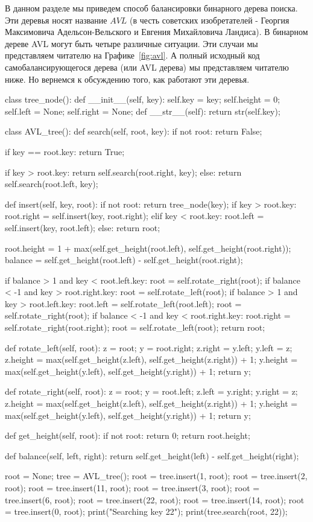 В данном разделе мы приведем способ балансировки бинарного дерева поиска. Эти деревья
носят название $AVL$ (в честь советских изобретателей - Георгия Максимовича 
Адельсон-Вельского и Евгения Михайловича Ландиса). В бинарном дереве AVL могут быть 
четыре различные ситуации. Эти случаи мы представляем читателю на Графике~\ref{fig:avl}.
А полный исходный код самобалансирующегося дерева (или AVL дерева) мы представляем
читателю ниже. Но вернемся к обсуждению того, как работают эти деревья. 

\begin{python}
class tree_node():
	def __init__(self, key):
		self.key = key;
		self.height = 0;
		self.left = None;
		self.right = None;
	def __str__(self):
		return str(self.key);

class AVL_tree():
	def search(self, root, key):
		if not root:
			return False;

		if key == root.key:
			return True;

		if key > root.key:
			return self.search(root.right, key);
		else:
			return self.search(root.left, key);

	def insert(self, key, root):
		if not root:
			return tree_node(key);
		if key > root.key:
			root.right = self.insert(key, root.right);
		elif key < root.key:
			root.left = self.insert(key, root.left);
		else:
			return root;

		root.height = 1 + max(self.get_height(root.left), self.get_height(root.right));
		balance = self.get_height(root.left) - self.get_height(root.right);

		if balance > 1 and key < root.left.key:
			root = self.rotate_right(root);
		if balance < -1 and key > root.right.key:
			root = self.rotate_left(root);
		if balance > 1 and key > root.left.key:
			root.left = self.rotate_left(root.left);
			root = self.rotate_right(root);
		if balance < -1 and key < root.right.key:
			root.right = self.rotate_right(root.right);
			root = self.rotate_left(root);
		return root;

	def rotate_left(self, root):
		z = root;
		y = root.right;		
		z.right = y.left;
		y.left = z;
		z.height = max(self.get_height(z.left), self.get_height(z.right)) + 1;
		y.height = max(self.get_height(y.left), self.get_height(y.right)) + 1;
		return y;

	def rotate_right(self, root):
		z = root;
		y = root.left;		
		z.left = y.right;
		y.right = z;
		z.height = max(self.get_height(z.left), self.get_height(z.right)) + 1;
		y.height = max(self.get_height(y.left), self.get_height(y.right)) + 1;
		return y;

	def get_height(self, root):
		if not root:
			return 0;
		return root.height;

	def balance(self, left, right):
		return self.get_height(left) - self.get_height(right);

root = None;
tree = AVL_tree();
root = tree.insert(1, root);
root = tree.insert(2, root);
root = tree.insert(11, root);
root = tree.insert(3, root);
root = tree.insert(6, root);
root = tree.insert(22, root);
root = tree.insert(14, root);
root = tree.insert(0, root);
print("Searching key 22");
print(tree.search(root, 22));
\end{python}

